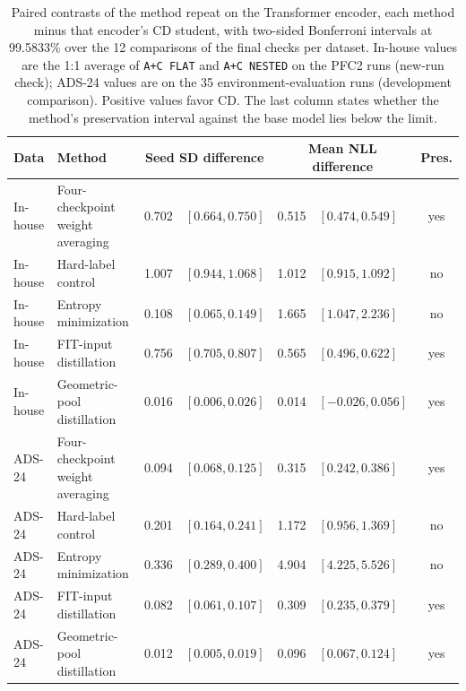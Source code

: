 \begin{table}[htbp]
\centering
\caption[Method repeat on the Transformer encoder]{Paired contrasts of the method repeat on the Transformer encoder,
each method minus that encoder's CD student, with two-sided Bonferroni
intervals at 99.5833\% over the 12 comparisons of the final checks per
dataset. In-house values are the 1:1 average of \texttt{A+C FLAT} and
\texttt{A+C NESTED} on the PFC2 runs (new-run check); ADS-24 values are
on the 35 environment-evaluation runs (development comparison).
Positive values favor CD. The last column states whether the method's
preservation interval against the base model lies below the limit.}
\label{tab:gen-logbert}
\small
\begin{tabular}{@{}llrlrlc@{}}
\toprule
Data & Method & \multicolumn{2}{c}{Seed SD difference}
 & \multicolumn{2}{c}{Mean NLL difference} & Pres. \\
\midrule
In-house & Four-checkpoint weight averaging & 0.702 & $[0.664, 0.750]$ & 0.515 & $[0.474, 0.549]$ & yes \\
In-house & Hard-label control     & 1.007 & $[0.944, 1.068]$ & 1.012 & $[0.915, 1.092]$ & no \\
In-house & Entropy minimization   & 0.108 & $[0.065, 0.149]$ & 1.665 & $[1.047, 2.236]$ & no \\
In-house & FIT-input distillation & 0.756 & $[0.705, 0.807]$ & 0.565 & $[0.496, 0.622]$ & yes \\
In-house & Geometric-pool distillation & 0.016 & $[0.006, 0.026]$ & 0.014 & $[-0.026, 0.056]$ & yes \\
\midrule
ADS-24 & Four-checkpoint weight averaging & 0.094 & $[0.068, 0.125]$ & 0.315 & $[0.242, 0.386]$ & yes \\
ADS-24 & Hard-label control     & 0.201 & $[0.164, 0.241]$ & 1.172 & $[0.956, 1.369]$ & no \\
ADS-24 & Entropy minimization   & 0.336 & $[0.289, 0.400]$ & 4.904 & $[4.225, 5.526]$ & no \\
ADS-24 & FIT-input distillation & 0.082 & $[0.061, 0.107]$ & 0.309 & $[0.235, 0.379]$ & yes \\
ADS-24 & Geometric-pool distillation & 0.012 & $[0.005, 0.019]$ & 0.096 & $[0.067, 0.124]$ & yes \\
\bottomrule
\end{tabular}
\end{table}

